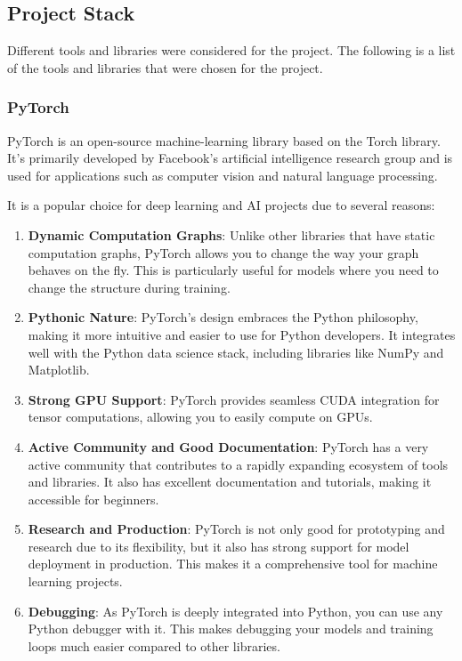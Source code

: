 \subsection{Project Stack}
Different tools and libraries were considered for the project. The following is a list of the tools and libraries that were chosen for the project.

\subsubsection{PyTorch}
PyTorch is an open-source machine-learning library based on the Torch library. It's primarily developed by Facebook's artificial intelligence research group and is used for applications such as computer vision and natural language processing.

It is a popular choice for deep learning and AI projects due to several reasons:
\begin{enumerate}
    \item \textbf{Dynamic Computation Graphs}: Unlike other libraries that have static computation graphs, PyTorch allows you to change the way your graph behaves on the fly. This is particularly useful for models where you need to change the structure during training.
    \item \textbf{Pythonic Nature}: PyTorch's design embraces the Python philosophy, making it more intuitive and easier to use for Python developers. It integrates well with the Python data science stack, including libraries like NumPy and Matplotlib.
    \item \textbf{Strong GPU Support}: PyTorch provides seamless CUDA integration for tensor computations, allowing you to easily compute on GPUs.
    \item \textbf{Active Community and Good Documentation}: PyTorch has a very active community that contributes to a rapidly expanding ecosystem of tools and libraries. It also has excellent documentation and tutorials, making it accessible for beginners.
    \item \textbf{Research and Production}: PyTorch is not only good for prototyping and research due to its flexibility, but it also has strong support for model deployment in production. This makes it a comprehensive tool for machine learning projects.
    \item \textbf{Debugging}: As PyTorch is deeply integrated into Python, you can use any Python debugger with it. This makes debugging your models and training loops much easier compared to other libraries.
\end{enumerate}

